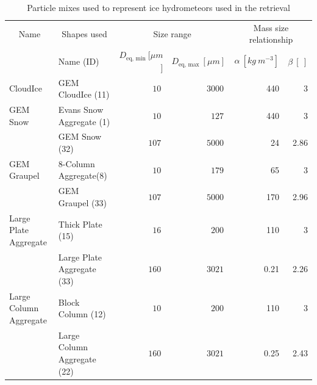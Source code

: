 \documentclass[journal abbreviation, manuscript]{copernicus}
\begin{document}
\begin{table}
  \centering
  \caption{Particle mixes used to represent ice hydrometeors used in the
    retrieval}
  \begin{tabular}{l|l|rr|rr}
    \multicolumn{1}{c|}{Name} & \multicolumn{1}{c|}{Shapes used} &
    \multicolumn{2}{c|}{Size range} & \multicolumn{2}{c}{Mass size relationship}
    \\
    & Name (ID) &$D_{\text{eq}, \text{ min}}\ [\unit{\mu m}$] &
    $D_{\text{eq}, \text{ max}}\ [\unit{\mu m}]$ &\hfill
    $\alpha\ [\unit{kg\ m^{-3}}]$ & \hfill $\beta\ [\ ]$ \\
    \hline \hline %
    CloudIce & GEM CloudIce (11) & $10\ $ & $3000\ $ & \hfill 440 & \hfill 3 \\
    \hline GEM Snow & Evans Snow Aggregate (1) & $10\ $ & $127\ $ & \hfill 440 &
    \hfill 3 \\ & GEM Snow (32) & $107\ $ & $5000\ $ & \hfill 24 & \hfill 2.86
    \\
    \hline GEM Graupel & 8-Column Aggregate(8) & $10\ $ & $179\ $ & \hfill 65 &
    \hfill 3 \\ & GEM Graupel (33) & $107\ $ & $5000\ $ & \hfill 170 & \hfill
    2.96 \\
    \hline Large Plate Aggregate & Thick Plate (15) & $16\ $ & $200\ $ & \hfill
    110 & \hfill 3 \\ & Large Plate Aggregate (33) & $160\ $ & $3021\ $ & \hfill
    0.21 & \hfill 2.26 \\
    \hline Large Column Aggregate & Block Column (12) & $10\ $ & $200\ $ &
    \hfill 110 & \hfill 3 \\ & Large Column Aggregate (22) & $160\ $ & $3021\ $
    & \hfill 0.25 & \hfill 2.43 \\
  \end{tabular}
  \label{tab:particle_properties}
\end{table}
\end{document}
